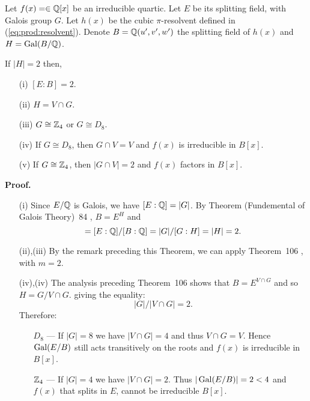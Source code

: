 \begin{llem} \label{llem:quartic:m2}
Let \(f(x)=\in \mathbb{Q}[x]\) be an irreducible quartic.
Let $E$ be its splitting field, with Galois
group $G$. Let \(h(x)\) be the cubic \(\pi\)-resolvent
defined in (\ref{eq:prod:resolvent}).
Denote \(B = \mathbb{Q}(u',v',w')\) the splitting field of \(h(x)\)
and \(H = \mathop{\rm Gal}\nolimits(B/\mathbb{Q})\).

If \(|H| = 2\) then,
\begin{itemize}
 \item[(i)] \([E:B] = 2\).
 \item[(ii)] \(H = V \cap G\).
 \item[(iii)] \(G \cong \mathbb{Z}_4\) or \(G \cong D_8\).
 \item[(iv)] If \(G \cong D_8\), then \(G\cap V = V\)
       and \(f(x)\) is irreducible in \(B[x]\).
 \item[(v)] If \(G \cong \mathbb{Z}_4\), then \(|G\cap V| = 2\)
       and \(f(x)\) factors in \(B[x]\).
\end{itemize}
\end{llem}
\textbf{Proof.}
\begin{itemize}

 \item[(i)] 
  Since \(E/\mathbb{Q}\) is Galois, we have \([E:\mathbb{Q}] = |G|\).
  By Theorem (Fundemental of Galois Theory)~84 \cite{Rotman98},
  \(B = E^H\) and
  \begin{equation*}
  [E:B] = [E:\Q]/[B:\Q] = |G|/[G:H] = |H| = 2.
  \end{equation*}

 \item[(ii),(iii)] 
  By the remark preceding this Theorem, we can apply 
  Theorem~106 \cite{Rotman98}, with \(m=2\).

 \item[(iv),(iv)]
  The analysis preceding Theorem~106 \cite{Rotman98} shows that
  \(B = E^{V\cap G}\) and so 
  \(H = G / V \cap G\). %
  giving the equality: 
  \begin{equation*}
   |G| / |V \cap G| = 2.
  \end{equation*}
  Therefore:
  \begin{itemize}
   \item[\(D_8\)] --- 
    If \(|G|=8\) we have \(|V \cap G| = 4\) and thus \(V \cap G = V\).
    Hence \(\mathop{\rm Gal}\nolimits(E/B)\) still acts transitively on the roots
    and \(f(x)\) is irreducible in  \(B[x]\).
   \item[\(\mathbb{Z}_4\)] --- 
    If \(|G|=4\) we have \(|V \cap G| = 2\).
    Thus \(|\mathop{\rm Gal}\nolimits(E/B)| = 2 < 4\) and \(f(x)\) 
    that splits in $E$, cannot be irreducible \(B[x]\).
  \end{itemize}
   
\end{itemize}
\proofend

